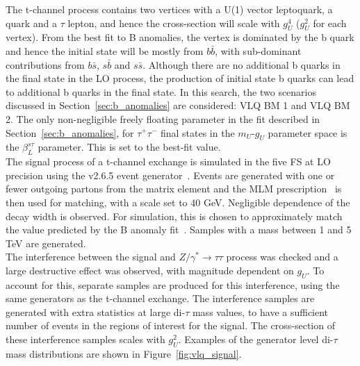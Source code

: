 The t-channel process contains two vertices with a U(1) vector leptoquark, a quark and a $\tau$ lepton, and hence the cross-section will scale with $g_{U}^4$ ($g_{U}^2$ for each vertex).
From the best fit to B anomalies, the vertex is dominated by the b quark and hence the initial state will be mostly from $b\bar{b}$, with sub-dominant contributions from $b\bar{s}$, $s\bar{b}$ and $s\bar{s}$.
Although there are no additional b quarks in the final state in the \ac{LO} process, the production of initial state b quarks can lead to additional b quarks in the final state.
In this search, the two scenarios discussed in Section~\ref{sec:b_anomalies} are considered: VLQ BM 1 and VLQ BM 2.
The only non-negligible freely floating parameter in the fit described in Section~\ref{sec:b_anomalies}, for $\tau^{+}\tau^{-}$ final states in the $m_{U}$-$g_{U}$ parameter space is the $\beta_{L}^{s\tau}$ parameter.
This is set to the best-fit value. \\

The signal process of a t-channel exchange is simulated in the five \ac{FS} at \ac{LO} precision using the \MGvATNLO v2.6.5 event generator~\cite{Alwall:2011uj}.
Events are generated with one or fewer outgoing partons from the matrix element and the MLM prescription~\cite{Frederix:2012ps} is then used for matching, with a scale set to 40 GeV.
Negligible dependence of the decay width is observed. 
For simulation, this is chosen to approximately match the value predicted by the B anomaly fit~\cite{Cornella:2021sby}.
Samples with a mass between 1 and 5 TeV are generated. \\

The interference between the signal and $Z/\gamma^* \rightarrow \tau\tau$ process was checked and a large destructive effect was observed, with magnitude dependent on $g_{U}$.
To account for this, separate samples are produced for this interference, using the same generators as the t-channel exchange.
The interference samples are generated with extra statistics at large di-$\tau$ mass values, to have a sufficient number of events in the regions of interest for the signal.
The cross-section of these interference samples scales with $g_{U}^2$. 
Examples of the generator level di-$\tau$ mass distributions are shown in Figure~\ref{fig:vlq_signal}. \\


